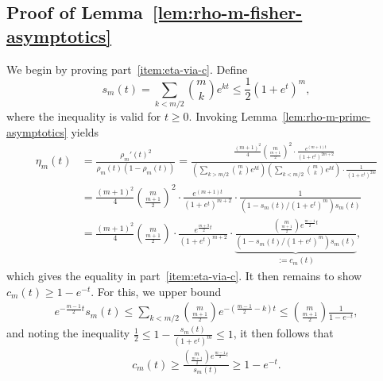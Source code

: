 \documentclass[11pt]{article}
\newcommand{\prn}[1]{\left({#1}\right)} %
\newcommand{\<}{\langle} %
\renewcommand{\>}{\rangle}
\newcommand{\half}{\frac{1}{2}}
\begin{document}
\subsection{Proof of Lemma~\ref{lem:rho-m-fisher-asymptotics}} \label{proof:rho-m-fisher-asymptotics}

We begin by proving part~\ref{item:eta-via-c}. Define
\begin{equation*}
  s_m(t) = \sum_{k <
    m/2} \binom{m}{k} e^{kt} \le \half (1+e^t)^m,
\end{equation*}
where the inequality is valid for $t \ge 0$.
Invoking Lemma~\ref{lem:rho-m-prime-asymptotics} yields
\begin{align*}
	\eta_m(t) & = \frac{\rho_m'(t)^2}{\rho_m(t)(1-\rho_m(t))} = \frac{\frac{(m+1)^2}{4} \binom{m}{\frac{m+1}{2}}^2 \cdot \frac{e^{(m+1)t}}{(1+e^t)^{2m+2}}}{\prn{\sum_{k > m/2} \binom{m}{k} e^{kt}} \prn{\sum_{k < m/2} \binom{m}{k} e^{kt}} \cdot \frac{1}{(1+e^t)^{2m}}} \nonumber \\
	& = \frac{(m+1)^2}{4} \binom{m}{\frac{m+1}{2}}^2 \cdot \frac{e^{(m+1)t}}{(1+e^t)^{m+2}} \cdot \frac{1}{(1 - s_m(t)/(1+e^t)^m) s_m(t)} \nonumber \\
	& = \frac{(m+1)^2}{4} \binom{m}{\frac{m+1}{2}} \cdot \frac{e^{\frac{m+3}{2}t}}{(1+e^t)^{m+2}} \cdot \underbrace{\frac{ \binom{m}{\frac{m+1}{2}} e^{\frac{m-1}{2}t}}{(1 - s_m(t)/(1+e^t)^m) s_m(t)}}_{:=c_m(t)},
\end{align*}
which gives the equality in part~\ref{item:eta-via-c}.
It then remains to show $c_m(t) \geq 1 - e^{-t}$. For this,
we upper bound
\begin{align*}
  e^{-\frac{m-1}{2}t} s_m(t) \leq \sum_{k < m/2}\binom{m}{\frac{m+1}{2}} e^{-\prn{\frac{m-1}{2}-k}t} \leq \binom{m}{\frac{m+1}{2}} \frac{1}{1-e^{-t}},
\end{align*}
and noting the inequality
$\half \le 1 - \frac{s_m(t)}{(1+e^t)^m} \leq 1$, it then follows
that
\begin{align*}
  c_m(t) \geq \frac{\binom{m}{\frac{m+1}{2}} e^{\frac{m-1}{2}t}}{s_m(t)} \geq 1 -e^{-t}.
\end{align*}
\end{document}
